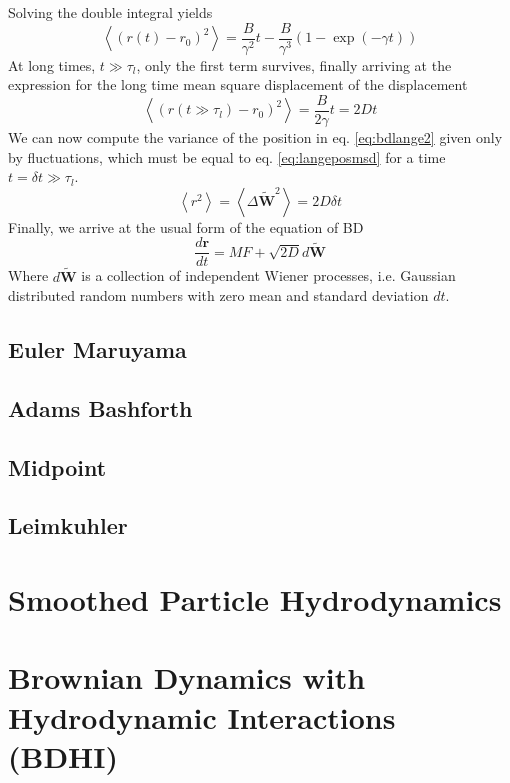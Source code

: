 \documentclass[ twoside,openright,titlepage,numbers=noenddot,%
headinclude,footinclude,cleardoublepage=empty,abstract=on,
BCOR=5mm,paper=a4,fontsize=11pt, dvipsnames
]{scrreprt}
\renewcommand{\vec}[1]{\bm{#1}}
\newcommand{\dt}{\delta t}
\begin{document}
Solving the double integral yields
\begin{equation}
  \left\langle(r(t) - r_0)^2 \right\rangle =  \frac{B}{\gamma^2}t - \frac{B}{\gamma^3}\left(1-\exp(-\gamma t)\right)
\end{equation}
At long times, $t \gg\tau_l$, only the first term survives, finally arriving at the expression for the long time mean square displacement of the displacement
\begin{equation}
  \label{eq:langeposmsd}
  \left\langle(r(t\gg\tau_l) - r_0)^2 \right\rangle = \frac{B}{2\gamma}t = 2Dt
\end{equation}
We can now compute the variance of the position in eq. \eqref{eq:bdlange2} given only by fluctuations, which must be equal to eq. \eqref{eq:langeposmsd} for a time $t = \dt \gg \tau_l$.
\begin{equation}
  \left\langle r^2 \right\rangle = \left\langle\Delta\vec{\widetilde{W}}^2\right\rangle = 2D\dt
\end{equation}
Finally, we arrive at the usual form of the equation of \gls{BD}
\begin{equation}
  \frac{d\vec{r}}{dt} = MF + \sqrt{2D}d\vec{\widetilde{W}}
\end{equation}
Where $d\vec{\widetilde{W}}$ is a collection of independent Wiener processes, i.e. Gaussian distributed random numbers with zero mean and standard deviation $dt$.
\subsection{Euler Maruyama}

\subsection{Adams Bashforth}

\subsection{Midpoint}

\subsection{Leimkuhler}


\section{Smoothed Particle Hydrodynamics}


\section{Brownian Dynamics with Hydrodynamic Interactions (BDHI)}
\end{document}
